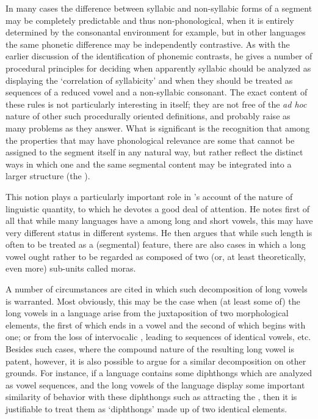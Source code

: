 In many cases the difference between syllabic and non-syllabic forms of
a segment may be completely predictable and thus non-phonological,
when it is entirely determined by the consonantal environment for
example, but in other languages the same phonetic difference may be
independently contrastive. As with the earlier discussion of the
identification of phonemic contrasts, he gives a number of procedural
principles for deciding when apparently syllabic  should be
analyzed as displaying the `correlation of syllabicity' and when they
should be treated as sequences of a reduced vowel and a non-syllabic
consonant. The exact content of these {rules} is not particularly
interesting in itself; they are not free of the \emph{ad hoc} nature of other
such procedurally oriented definitions, and probably raise as many
problems as they answer. What is significant is the recognition that
among the properties that may have phonological relevance are some
that cannot be assigned to the segment itself in any natural way, but
rather reflect the distinct ways in which one and the same segmental
content may be integrated into a larger structure (the ).

This notion plays a particularly important role in {\Trubetzkoy}'s
account of the nature of linguistic quantity, to which he devotes a
good deal of attention. He notes first of all that while many
languages have a  among long and short vowels, this 
may have very different status in different systems. He then argues
that while such length is often to be treated as a (segmental)
feature, there are also cases in which a long vowel ought rather to be
regarded as composed of two (or, at least theoretically, even more)
sub-units called moras.

A number of circumstances are cited in which such decomposition of
long vowels is warranted. Most obviously, this may be the case when
(at least some of) the long vowels in a language arise from the
juxtaposition of two morphological elements, the first of which ends
in a vowel and the second of which begins with one; or from the loss
of intervocalic , leading to sequences of identical vowels,
etc. Besides such cases, where the compound nature of the resulting
long vowel is patent, however, it is also possible to argue for a
similar decomposition on other grounds. For instance, if a language
contains some diphthongs which are analyzed as vowel sequences, and
the long vowels of the language display some important similarity of
behavior with these diphthongs such as attracting the , then it
is justifiable to treat them as `diphthongs' made up of two identical
elements.

